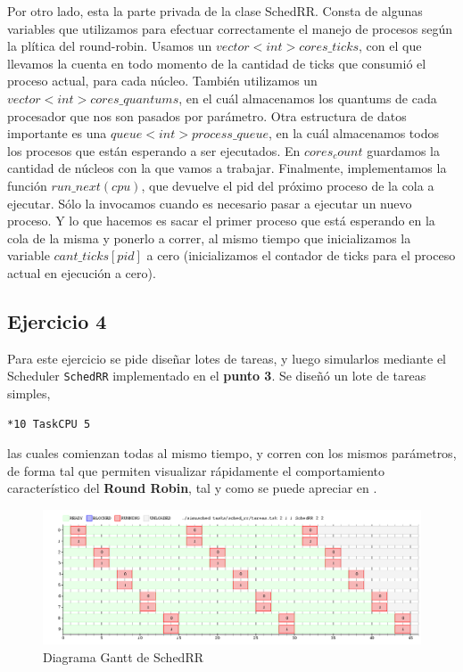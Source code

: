 \documentclass[11pt, a4paper, twoside]{article}
\begin{document}
Por otro lado, esta la parte privada de la clase SchedRR. Consta de algunas variables que utilizamos para efectuar
correctamente el manejo de procesos según la plítica del round-robin. Usamos un $vector<int> cores\_ticks$, 
con el que llevamos la cuenta en todo momento de la cantidad de ticks que consumió el proceso actual, 
para cada núcleo. También utilizamos un $vector<int> cores\_quantums$, en el cuál almacenamos los quantums
de cada procesador que nos son pasados por parámetro. Otra estructura de datos importante es una
$queue<int> process\_queue$, en la cuál almacenamos todos los procesos que están esperando a ser ejecutados.
En $cores_count$ guardamos la cantidad de núcleos con la que vamos a trabajar. Finalmente, implementamos la
función $run\_next(cpu)$, que devuelve el pid del próximo proceso de la cola a ejecutar. Sólo la invocamos
cuando es necesario pasar a ejecutar un nuevo proceso. Y lo que hacemos es sacar el primer proceso que está 
esperando en la cola de la misma y ponerlo a correr, al mismo tiempo que inicializamos la variable
$cant\_ticks[pid]$ a cero (inicializamos el contador de ticks para el proceso actual en ejecución a cero). 


\clearpage
\subsection{Ejercicio 4}

Para este ejercicio se pide diseñar lotes de tareas, y luego simularlos mediante el Scheduler
\texttt{SchedRR} implementado en el \textbf{punto 3}. Se diseñó un lote de tareas simples,

\begin{minipage}{5cm}
\begin{Verbatim}[frame=single,framesep=1cm,label=task\_sched\_rr.tsk]
*10 TaskCPU 5  
\end{Verbatim}
\end{minipage}

las cuales comienzan todas al mismo tiempo, y corren con los mismos parámetros, de forma tal que 
permiten visualizar rápidamente el comportamiento característico del \textbf{Round Robin}, tal y como
se puede apreciar en .

\begin{figure}[H]
  \centering
  \includegraphics [width=\textwidth]{../graficos/sched_rr/output1.png}
  \caption{Diagrama Gantt de SchedRR}
  \label{fig:gantt-sched-rr}
\end{figure}
\end{document}
